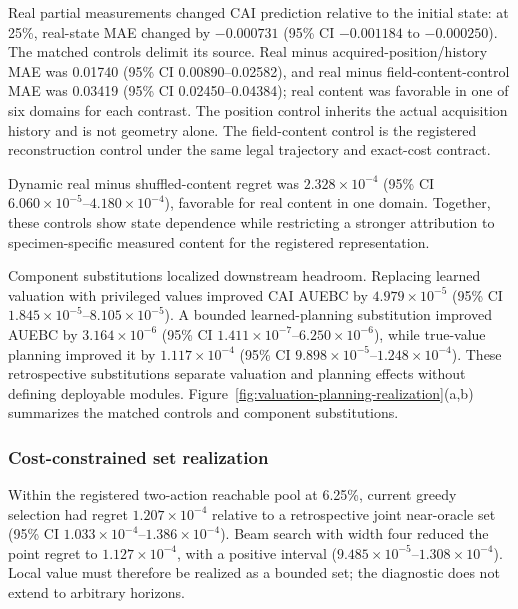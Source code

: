 \documentclass[preprint,12pt]{elsarticle}
\begin{document}
Real partial measurements changed CAI prediction relative to the initial state:
at 25\%, real-state MAE changed by $-0.000731$ (95\% CI
$-0.001184$ to $-0.000250$). The matched controls delimit its source. Real
minus acquired-position/history MAE was 0.01740 (95\% CI 0.00890--0.02582),
and real minus field-content-control MAE was 0.03419 (95\% CI
0.02450--0.04384); real content was favorable in one of six domains for each
contrast. The position control inherits the actual acquisition history and is
not geometry alone. The field-content control is the registered reconstruction
control under the same legal trajectory and exact-cost contract.

Dynamic real minus shuffled-content regret was
$2.328\times10^{-4}$ (95\% CI
$6.060\times10^{-5}$--$4.180\times10^{-4}$), favorable for real content in one
domain. Together, these controls show state dependence while restricting a
stronger attribution to specimen-specific measured content for the registered
representation.

Component substitutions localized downstream headroom. Replacing learned
valuation with privileged values improved CAI AUEBC by
$4.979\times10^{-5}$ (95\% CI
$1.845\times10^{-5}$--$8.105\times10^{-5}$). A bounded learned-planning
substitution improved AUEBC by $3.164\times10^{-6}$ (95\% CI
$1.411\times10^{-7}$--$6.250\times10^{-6}$), while true-value planning
improved it by $1.117\times10^{-4}$ (95\% CI
$9.898\times10^{-5}$--$1.248\times10^{-4}$). These retrospective substitutions
separate valuation and planning effects without defining deployable modules.
Figure~\ref{fig:valuation-planning-realization}(a,b) summarizes the matched
controls and component substitutions.

\subsubsection{Cost-constrained set realization}
\label{sec:results-realization}

Within the registered two-action reachable pool at 6.25\%, current greedy
selection had regret $1.207\times10^{-4}$ relative to a retrospective joint
near-oracle set (95\% CI $1.033\times10^{-4}$--$1.386\times10^{-4}$).
Beam search with width four reduced the point regret to
$1.127\times10^{-4}$, with a positive interval
($9.485\times10^{-5}$--$1.308\times10^{-4}$). Local value must therefore be
realized as a bounded set; the diagnostic does not extend to arbitrary
horizons.
\end{document}

